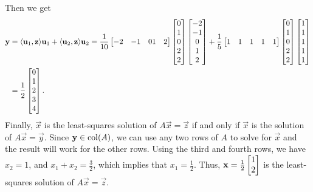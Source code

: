\documentclass{homework}
\begin{document}
\begin{enumerate}
		Then we get
		\begin{equation*}
		\begin{aligned}
			\mathbf{y} &= \langle\mathbf{u}_1,\mathbf{z}\rangle\mathbf{u}_1 + \langle\mathbf{u}_2,\mathbf{z}\rangle\mathbf{u}_2 = \frac{1}{10}\left[\begin{matrix}-2&-1&01&2\end{matrix}\right]\left[\begin{matrix}0\\1\\0\\2\\2\end{matrix}\right]\left[\begin{matrix}-2\\-1\\0\\1\\2\end{matrix}\right] + \frac{1}{5}\left[\begin{matrix}1&1&1&1&1\end{matrix}\right]\left[\begin{matrix}0\\1\\0\\2\\2\end{matrix}\right]\left[\begin{matrix}1\\1\\1\\1\\1\end{matrix}\right] \\
			&= \frac{1}{2}\left[\begin{matrix}0 \\ 1 \\ 2 \\ 3 \\ 4\end{matrix}\right].
		\end{aligned}
		\end{equation*}
		Finally, $\vec{x}$ is the least-squares solution of $A\vec{x} = \vec{z}$ if and only if $\vec{x}$ is the solution of $A\vec{x} = \vec{y}$. Since $\mathbf{y} \in \mathrm{col}(A)$, we can use any two rows of $A$ to solve for $\vec{x}$ and the result will work for the other rows. Using the third and fourth rows, we have $x_2 = 1$, and $x_1 + x_2 = \frac{3}{2}$, which implies that $x_1 = \frac{1}{2}$. Thus, $\mathbf{x} = \frac{1}{2}\left[\begin{matrix}1\\2\end{matrix}\right]$ is the least-squares solution of $A\vec{x} = \vec{z}$.
	\end{enumerate}
	
\end{document}
